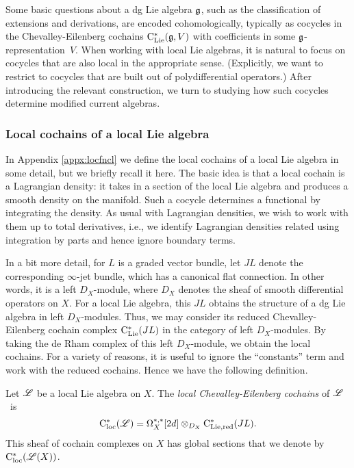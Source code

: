 Some basic questions about a dg Lie algebra $\mathfrak g$, such as the classification of extensions and derivations, are encoded cohomologically, typically as cocycles in the Chevalley-Eilenberg cochains ${\rm C}_{\rm Lie}^*(\mathfrak g,V)$ with coefficients in some $\mathfrak g$-representation~$V$.
When working with local Lie algebras, it is natural to focus on cocycles that are also local in the appropriate sense.
(Explicitly, we want to restrict to cocycles that are built out of polydifferential operators.)
After introducing the relevant construction, we turn to studying how such cocycles determine modified current algebras.

\subsubsection{Local cochains of a local Lie algebra}

In Appendix \ref{appx:locfncl} we define the local cochains of a local Lie algebra in some detail, 
but we briefly recall it here.
The basic idea is that a local cochain is a Lagrangian density: 
it takes in a section of the local Lie algebra and produces a smooth density on the manifold. 
Such a cocycle determines a functional by integrating the density.
As usual with Lagrangian densities, we wish to work with them up to total derivatives,
i.e., we identify Lagrangian densities related using integration by parts and hence ignore boundary terms.

In a bit more detail, for $L$ is a graded vector bundle, let $JL$ denote the corresponding $\infty$-jet bundle,
which has a canonical flat connection.
In other words, it is a left $D_X$-module, where $D_X$ denotes the sheaf of smooth differential operators on $X$.
For a local Lie algebra, this $JL$ obtains the structure of a dg Lie algebra in left $D_X$-modules.
Thus, we may consider its reduced Chevalley-Eilenberg cochain complex ${\rm C}_{\rm Lie}^*(JL)$ in the category of left $D_X$-modules. 
By taking the de Rham complex of this left $D_X$-module, we obtain the local cochains.
For a variety of reasons, it is useful to ignore the ``constants'' term and work with the reduced cochains.
Hence we have the following definition.

\begin{dfn}
Let $\mathscr L$ be a local Lie algebra on $X$.
The {\em local Chevalley-Eilenberg cochains}  of $\mathscr L$~is 
\[
{\rm C}_{\rm loc}^*(\mathscr L) = \Omega^{*,*}_X[2d] \otimes_{D_X} {\rm C}_{\rm Lie, red}^*(J L) .
\]
This sheaf of cochain complexes on $X$ has global sections that we denote by~${\rm C}_{\rm loc}^*(\mathscr L(X))$.
\end{dfn}

